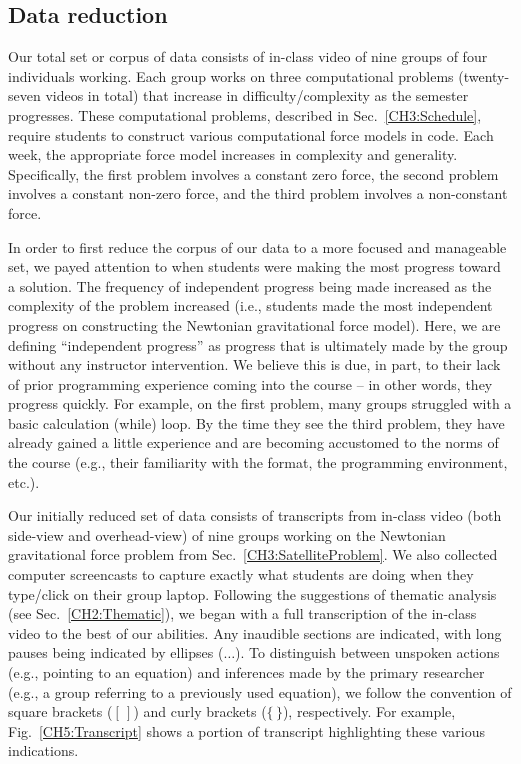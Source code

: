 \documentclass{msuphddissertation}
\begin{document}
\begin{doublespace}
\subsection{Data reduction}

Our total set or corpus of data consists of in-class video of nine groups of four individuals working.  Each group works on three computational problems (twenty-seven videos in total) that increase in difficulty/complexity as the semester progresses.  These computational problems, described in Sec.~\ref{CH3:Schedule}, require students to construct various computational force models in code.  Each week, the appropriate force model increases in complexity and generality.  Specifically, the first problem involves a constant zero force, the second problem involves a constant non-zero force, and the third problem involves a non-constant force.

In order to first reduce the corpus of our data to a more focused and manageable set, we payed attention to when students were making the most progress toward a solution.  The frequency of independent progress being made increased as the complexity of the problem increased (i.e., students made the most independent progress on constructing the Newtonian gravitational force model).  Here, we are defining ``independent progress'' as progress that is ultimately made by the group without any instructor intervention.  We believe this is due, in part, to their lack of prior programming experience coming into the course -- in other words, they progress quickly.  For example, on the first problem, many groups struggled with a basic calculation (while) loop.  By the time they see the third problem, they have already gained a little experience and are becoming accustomed to the norms of the course (e.g., their familiarity with the format, the programming environment, etc.).

Our initially reduced set of data consists of transcripts from in-class video (both side-view and overhead-view) of nine groups working on the Newtonian gravitational force problem from Sec.~\ref{CH3:SatelliteProblem}.  We also collected computer screencasts to capture exactly what students are doing when they type/click on their group laptop.  Following the suggestions of thematic analysis (see Sec.~\ref{CH2:Thematic}), we began with a full transcription of the in-class video to the best of our abilities.  Any inaudible sections are indicated, with long pauses being indicated by ellipses ($\ldots$).  To distinguish between unspoken actions (e.g., pointing to an equation) and inferences made by the primary researcher (e.g., a group referring to a previously used equation), we follow the convention of square brackets ($[\,]$) and curly brackets ($\{\,\}$), respectively.  For example, Fig.~\ref{CH5:Transcript} shows a portion of transcript highlighting these various indications.


\end{doublespace}
\end{document}
